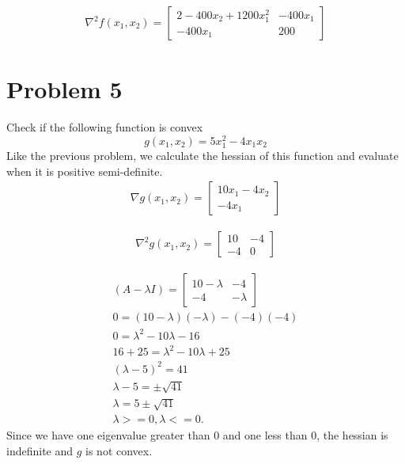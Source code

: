 \documentclass[11pt]{article}
\begin{document}
\begin{align*}
  \nabla^2 f (x_1, x_2) =
  \begin{bmatrix}
    2 - 400x_2 + 1200 x_1^2 & -400 x_1 \\
    -400x_1 & 200
  \end{bmatrix}
\end{align*}


\section{Problem 5}
Check if the following function is convex
\begin{equation*}
  g(x_1, x_2) = 5 x_1^2 - 4x_1 x_2
\end{equation*}
Like the previous problem, we calculate the hessian of this function and evaluate when it is positive semi-definite.
\begin{align*}
  \nabla g(x_1, x_2) = 
  \begin{bmatrix}
    10 x_1 - 4 x_2 \\
    -4 x_1
  \end{bmatrix}
\end{align*}

\begin{align*}
  \nabla^2 g(x_1, x_2) = 
  \begin{bmatrix}
    10  & -4 \\
    -4 & 0
  \end{bmatrix}
\end{align*}

\begin{align*}
  (A - \lambda I) = 
  \begin{bmatrix}
    10 - \lambda  & -4 \\
    -4 & - \lambda
  \end{bmatrix}
  \\
  0 = (10- \lambda)(-\lambda) - (-4)(-4) \\
  0 = \lambda^2 - 10 \lambda - 16  \\
  16 + 25 = \lambda^2 - 10 \lambda + 25 \\
  (\lambda - 5)^2 = 41 \\
  \lambda - 5 = \pm \sqrt{41} \\
  \lambda = 5 \pm \sqrt{41} \\
  \lambda >= 0, \lambda <=0.
\end{align*}
Since we have one eigenvalue greater than 0 and one less than 0, the hessian is indefinite and $g$ is not convex.
\end{document}
